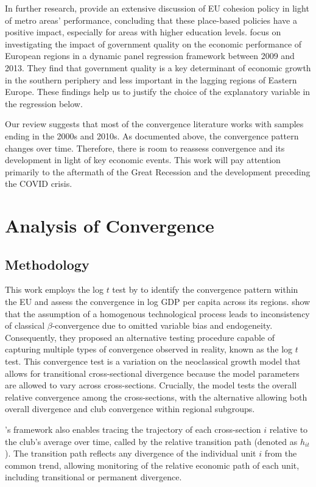 \documentclass[11pt]{article}
\begin{document}
In further research, \citet{ehrlich2020place} provide an extensive discussion of EU cohesion policy in light of metro areas' performance, concluding that these place-based policies have a positive impact, especially for areas with higher education levels. \citet{rodriguez2020institutional} focus on investigating the impact of government quality on the economic performance of European regions in a dynamic panel regression framework between 2009 and 2013. They find that government quality is a key determinant of economic growth in the southern periphery and less important in the lagging regions of Eastern Europe. These findings help us to justify the choice of the explanatory variable in the regression below.

Our review suggests that most of the convergence literature works with samples ending in the 2000s and 2010s. As documented above, the convergence pattern changes over time. Therefore, there is room to reassess convergence and its development in light of key economic events. This work will pay attention primarily to the aftermath of the Great Recession and the development preceding the COVID crisis.

\section{Analysis of Convergence}
\subsection{Methodology}

This work employs the log $t$ test by \citet{phillips2007transition} to identify the convergence pattern within the EU and assess the convergence in log GDP per capita across its regions. \citet{phillips2007transition} show that the assumption of a homogenous technological process leads to inconsistency of classical $\beta$-convergence due to omitted variable bias and endogeneity. Consequently, they proposed an alternative testing procedure capable of capturing multiple types of convergence observed in reality, known as the log $t$ test. This convergence test is a variation on the neoclassical growth model that allows for transitional cross-sectional divergence because the model parameters are allowed to vary across cross-sections. Crucially, the model tests the overall relative convergence among the cross-sections, with the alternative allowing both overall divergence and club convergence within regional subgroups. 

\citeauthor{phillips2009economic}'s framework also enables tracing the trajectory of each cross-section $i$ relative to the club's average over time, called by \citet{phillips2009economic} the relative transition path (denoted as $h_{it}$ ). The transition path reflects any divergence of the individual unit $i$ from the common trend, allowing monitoring of the relative economic path of each unit, including transitional or permanent divergence.
\end{document}
